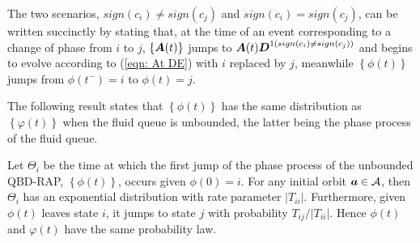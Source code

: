 The two scenarios, \(sign(c_i)\neq sign(c_j)\) and \(sign(c_i)= sign(c_j)\), can be written succinctly by stating that, at the time of an event corresponding to a change of phase from \(i\) to \(j\), \(\{\boldsymbol A(t)\}\) jumps to \(\boldsymbol A(t)\boldsymbol{D}^{1(sign(c_i)\neq sign(c_j))}\) and begins to evolve according to (\ref{eqn: At DE}) with \(i\) replaced by \(j\), meanwhile \(\left\{{\phi}(t)\right\}\) jumps from \(\phi(t^-)=i\) to \(\phi(t)=j\). %

The following result states that \(\left\{{\phi}(t)\right\}\) has the same distribution as \(\left\{{\varphi}(t)\right\}\) when the fluid queue is unbounded, the latter being the phase process of the fluid queue. 
\begin{thm}\label{thm: 1}
	Let \(\Theta_i\) be the time at which the first jump of the phase process of the unbounded QBD-RAP, \(\left\{{\phi}(t)\right\}\), occurs given \(\phi(0)=i\). For any initial orbit \(\boldsymbol a\in\mathcal A\), then \(\Theta_i\) has an exponential distribution with rate parameter \(|T_{ii}|\). Furthermore, given \({\phi}(t)\) leaves state \(i\), it jumps to state \(j\) with probability \(T_{ij}/|T_{ii}|\). Hence \({\phi}(t)\) and \(\varphi(t)\) have the same probability law. 
\end{thm}
